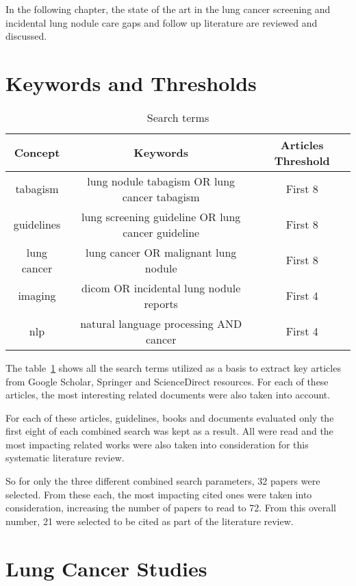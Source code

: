 \label{chap:literature_review}

In the following chapter, the state of the art in the lung cancer screening and incidental lung nodule care gaps and follow up literature are reviewed and discussed.

\section{Keywords and Thresholds}
\begin{center}
\begin{table}

  \begin{tabular}{c|c|c}
    \hline 
    Concept & Keywords & Articles Threshold\tabularnewline
    \hline 
    tabagism & lung nodule tabagism OR lung cancer tabagism & First 8\tabularnewline
    guidelines & lung screening guideline OR lung cancer guideline & First 8\tabularnewline
    lung cancer & lung cancer OR malignant lung nodule & First 8\tabularnewline
    imaging & dicom OR incidental lung nodule reports & First 4\tabularnewline
    nlp & natural language processing AND cancer & First 4\tabularnewline
    \hline 
  \end{tabular}
\par
\caption{\label{table:search_terms} Search terms}
\end{table}
  \vspace*{-44pt}
\end{center}

The table~\ref{table:search_terms} shows all the search terms utilized as a basis to extract key articles from Google Scholar, Springer  and ScienceDirect resources. For each of these articles, the most interesting related documents were also taken into account.

For each of these articles, guidelines, books and documents evaluated only the first eight of each combined search was kept as a result. All were read and the most impacting related works were also taken into consideration for this systematic literature review.

So for only the three different combined search parameters, 32 papers were selected. From these each, the  most impacting cited ones were taken into consideration, increasing the number of papers to  read to 72. From this overall number, 21 were selected to be cited as part of the literature review. %

\section{Lung Cancer Studies}

